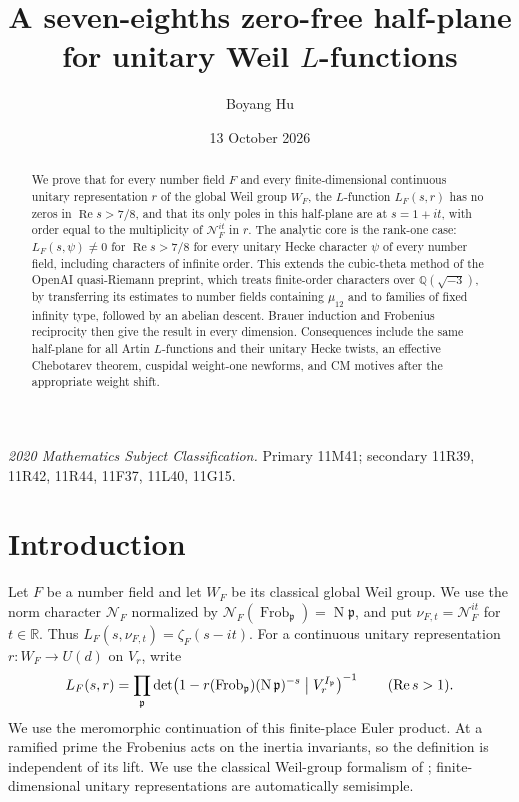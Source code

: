 \documentclass[11pt,a4paper]{article}
\title{\vspace{-1em}A seven-eighths zero-free half-plane\\for unitary Weil $L$-functions}
\author{Boyang Hu}
\date{13 October 2026}
\numberwithin{equation}{section}
\theoremstyle{definition}
\theoremstyle{remark}
\newcommand{\RR}{\mathbb R}
\newcommand{\QQ}{\mathbb Q}
\newcommand{\Rea}{\operatorname{Re}}
\newcommand{\Norm}{\operatorname{N}}
\begin{document}
\maketitle
\thispagestyle{plain}
\begin{abstract}
We prove that for every number field $F$ and every finite-dimensional
continuous unitary representation $r$ of the global Weil group $W_F$,
the $L$-function $L_F(s,r)$ has no zeros in $\Rea s>7/8$, and that its
only poles in this half-plane are at $s=1+it$, with order equal to the
multiplicity of $\mathcal N_F^{it}$ in $r$. The analytic core is the
rank-one case: $L_F(s,\psi)\ne0$ for $\Rea s>7/8$ for every unitary
Hecke character $\psi$ of every number field, including characters of
infinite order. This extends the cubic-theta method of the OpenAI
quasi-Riemann preprint, which treats finite-order characters over
$\QQ(\sqrt{-3})$, by transferring its estimates to number fields
containing $\mu_{12}$ and to families of fixed infinity type, followed
by an abelian descent. Brauer induction and Frobenius reciprocity then
give the result in every dimension. Consequences include the same
half-plane for all Artin $L$-functions and their unitary Hecke twists,
an effective Chebotarev theorem, cuspidal weight-one newforms, and CM
motives after the appropriate weight shift.
\end{abstract}

\noindent\textit{2020 Mathematics Subject Classification.} Primary 11M41;
secondary 11R39, 11R42, 11R44, 11F37, 11L40, 11G15.

\section{Introduction}\label{sec:introduction}

Let $F$ be a number field and let $W_F$ be its classical global Weil
group.  We use the norm character $\mathcal N_F$ normalized by
$\mathcal N_F(\operatorname{Frob}_{\mathfrak p})=\Norm\mathfrak p$,
and put $\nu_{F,t}=\mathcal N_F^{it}$ for $t\in\RR$.  Thus
$L_F(s,\nu_{F,t})=\zeta_F(s-it)$.  For a continuous unitary
representation $r:W_F\longrightarrow U(d)$ on $V_r$, write
\[
 L_F(s,r)=\prod_{\mathfrak p}
 \det\!\left(1-r(\operatorname{Frob}_{\mathfrak p})
     (\Norm\mathfrak p)^{-s}\bigm|V_r^{I_{\mathfrak p}}\right)^{-1}
 \qquad(\Rea s>1).
\]
We use the meromorphic continuation of this finite-place Euler product.  At a ramified prime the
Frobenius acts on the inertia invariants, so the definition is independent
of its lift.  We use the classical Weil-group formalism of
\cite[Chapters~1, 2 and~20]{Langlands}; finite-dimensional unitary
representations are automatically semisimple.
\end{document}
